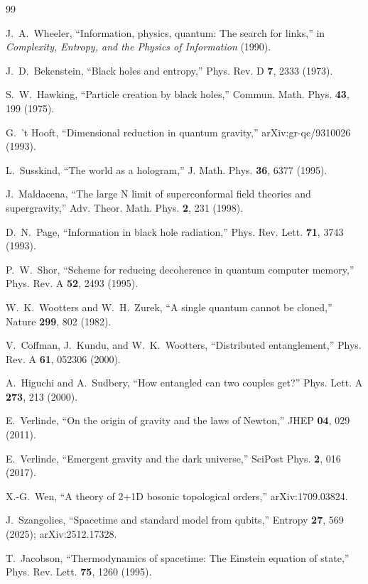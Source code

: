 \documentclass[11pt,a4paper]{article}
\begin{document}
\begin{thebibliography}{99}

 J.~A.~Wheeler, ``Information, physics, quantum: The search for links,'' in \emph{Complexity, Entropy, and the Physics of Information} (1990).

 J.~D.~Bekenstein, ``Black holes and entropy,'' Phys. Rev. D \textbf{7}, 2333 (1973).

 S.~W.~Hawking, ``Particle creation by black holes,'' Commun. Math. Phys. \textbf{43}, 199 (1975).

 G.~'t Hooft, ``Dimensional reduction in quantum gravity,'' arXiv:gr-qc/9310026 (1993).

 L.~Susskind, ``The world as a hologram,'' J. Math. Phys. \textbf{36}, 6377 (1995).

 J.~Maldacena, ``The large N limit of superconformal field theories and supergravity,'' Adv. Theor. Math. Phys. \textbf{2}, 231 (1998).

 D.~N.~Page, ``Information in black hole radiation,'' Phys. Rev. Lett. \textbf{71}, 3743 (1993).

 P.~W.~Shor, ``Scheme for reducing decoherence in quantum computer memory,'' Phys. Rev. A \textbf{52}, 2493 (1995).

 W.~K.~Wootters and W.~H.~Zurek, ``A single quantum cannot be cloned,'' Nature \textbf{299}, 802 (1982).

 V.~Coffman, J.~Kundu, and W.~K.~Wootters, ``Distributed entanglement,'' Phys. Rev. A \textbf{61}, 052306 (2000).

 A.~Higuchi and A.~Sudbery, ``How entangled can two couples get?'' Phys. Lett. A \textbf{273}, 213 (2000).

 E.~Verlinde, ``On the origin of gravity and the laws of Newton,'' JHEP \textbf{04}, 029 (2011).

 E.~Verlinde, ``Emergent gravity and the dark universe,'' SciPost Phys. \textbf{2}, 016 (2017).

 X.-G.~Wen, ``A theory of 2+1D bosonic topological orders,'' arXiv:1709.03824.

 J.~Szangolies, ``Spacetime and standard model from qubits,'' Entropy \textbf{27}, 569 (2025); arXiv:2512.17328.

 T.~Jacobson, ``Thermodynamics of spacetime: The Einstein equation of state,'' Phys. Rev. Lett. \textbf{75}, 1260 (1995).


\end{thebibliography}
\end{document}
